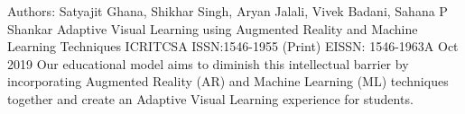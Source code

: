 
\begin{cventries}

\cventry
    {Authors: Satyajit Ghana, Shikhar Singh, Aryan Jalali, Vivek Badani, Sahana P Shankar}
    {Adaptive Visual Learning using Augmented Reality and Machine Learning Techniques}
    {ICRITCSA ISSN:1546-1955 (Print) EISSN: 1546-1963A}
    {Oct 2019}
    {Our educational
model aims to diminish this intellectual barrier by incorporating Augmented Reality (AR) and
Machine Learning (ML) techniques together and create an Adaptive Visual Learning experience
for students.}

    
\end{cventries}
